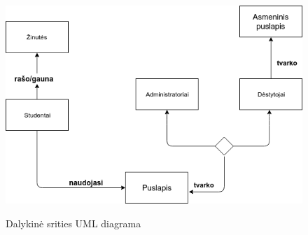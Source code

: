 \documentclass{VUMIFPSkursinis}
\begin{document}
\begin{figure}[H]
\centering
\includegraphics[width=\linewidth]{img/dalykine.png}
\label{fig:dalykine}
\caption{Dalykinė srities UML diagrama}
\end{figure}
\end{document}
